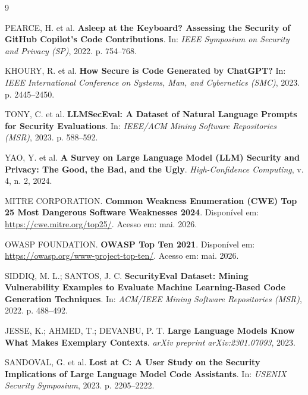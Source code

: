\documentclass[12pt]{article}
\begin{document}
\begin{thebibliography}{9}

PEARCE, H. et al.
\textbf{Asleep at the Keyboard? Assessing the Security of GitHub Copilot's Code Contributions}.
In: \textit{IEEE Symposium on Security and Privacy (SP)}, 2022. p. 754--768.

KHOURY, R. et al.
\textbf{How Secure is Code Generated by ChatGPT?}
In: \textit{IEEE International Conference on Systems, Man, and Cybernetics (SMC)}, 2023. p. 2445--2450.

TONY, C. et al.
\textbf{LLMSecEval: A Dataset of Natural Language Prompts for Security Evaluations}.
In: \textit{IEEE/ACM Mining Software Repositories (MSR)}, 2023. p. 588--592.

YAO, Y. et al.
\textbf{A Survey on Large Language Model (LLM) Security and Privacy: The Good, the Bad, and the Ugly}.
\textit{High-Confidence Computing}, v. 4, n. 2, 2024.

MITRE CORPORATION.
\textbf{Common Weakness Enumeration (CWE) Top 25 Most Dangerous Software Weaknesses 2024}.
Disponível em: \url{https://cwe.mitre.org/top25/}. Acesso em: mai. 2026.

OWASP FOUNDATION.
\textbf{OWASP Top Ten 2021}.
Disponível em: \url{https://owasp.org/www-project-top-ten/}. Acesso em: mai. 2026.

SIDDIQ, M. L.; SANTOS, J. C.
\textbf{SecurityEval Dataset: Mining Vulnerability Examples to Evaluate Machine Learning-Based Code Generation Techniques}.
In: \textit{ACM/IEEE Mining Software Repositories (MSR)}, 2022. p. 488--492.

JESSE, K.; AHMED, T.; DEVANBU, P. T.
\textbf{Large Language Models Know What Makes Exemplary Contexts}.
\textit{arXiv preprint arXiv:2301.07093}, 2023.

SANDOVAL, G. et al.
\textbf{Lost at C: A User Study on the Security Implications of Large Language Model Code Assistants}.
In: \textit{USENIX Security Symposium}, 2023. p. 2205--2222.

\end{thebibliography}
\end{document}
